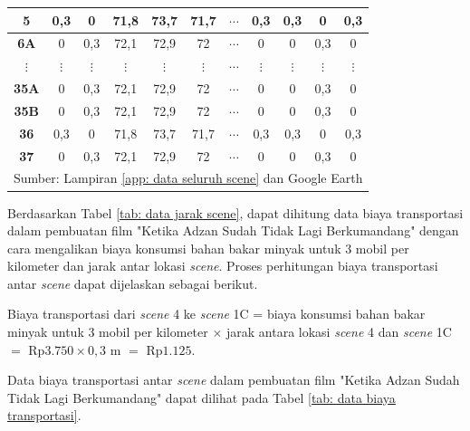 {{{\begin{tabularx}{\textwidth}{|c|c|c|c|c|c|c|c|c|c|c|}
    \textbf{5}              & 0,3        & 0           & 71,8        & 73,7        & 71,7        & $\cdots$          & 0,3          & 0,3          & 0            & 0,3         \\ \hline
    \textbf{6A}             & 0          & 0,3         & 72,1        & 72,9        & 72          & $\cdots$          & 0            & 0            & 0,3          & 0           \\ \hline
    \textbf{$\vdots$}       & $\vdots$   & $\vdots$    & $\vdots$    & $\vdots$    & $\vdots$    & $\cdots$          & $\vdots$     & $\vdots$     & $\vdots$     & $\vdots$    \\ \hline
    \textbf{35A}            & 0          & 0,3         & 72,1        & 72,9        & 72          & $\cdots$          & 0            & 0            & 0,3          & 0           \\ \hline
    \textbf{35B}            & 0          & 0,3         & 72,1        & 72,9        & 72          & $\cdots$          & 0            & 0            & 0,3          & 0           \\ \hline
    \textbf{36}             & 0,3        & 0           & 71,8        & 73,7        & 71,7        & $\cdots$          & 0,3          & 0,3          & 0            & 0,3         \\ \hline
    \textbf{37}             & 0          & 0,3         & 72,1        & 72,9        & 72          & $\cdots$          & 0            & 0            & 0,3          & 0           \\ \hline
    \multicolumn{11}{l}{{\normalsize Sumber: Lampiran \ref{app: data seluruh scene} dan Google Earth}}
\end{tabularx}
}

Berdasarkan Tabel \ref{tab: data jarak scene}, dapat dihitung data biaya transportasi dalam pembuatan film "Ketika Adzan Sudah Tidak Lagi Berkumandang"
dengan cara mengalikan biaya konsumsi bahan bakar minyak untuk 3 mobil per kilometer dan jarak antar lokasi \textit{scene}.
Proses perhitungan biaya transportasi antar \textit{scene} dapat dijelaskan sebagai berikut.

\noindent
Biaya transportasi dari \textit{scene} 4 ke \textit{scene} 1C = biaya konsumsi bahan bakar minyak untuk 3 mobil per kilometer $\times$ jarak antara lokasi \textit{scene} 4 dan \textit{scene} 1C $=$ Rp$3.750 \times 0,3$ m $=$ Rp$1.125$.

\noindent
Data biaya transportasi antar \textit{scene} dalam pembuatan film "Ketika Adzan Sudah Tidak Lagi Berkumandang" dapat dilihat pada Tabel \ref{tab: data biaya transportasi}.


}}
